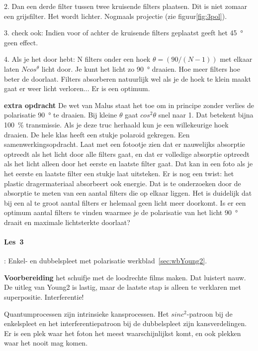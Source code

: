 \documentclass[../../main.tex]{subfiles}
\begin{document}
2. Dan een derde filter tussen twee kruisende filters plaatsen. Dit is niet zomaar een grijsfilter. Het wordt lichter. Nogmaals projectie (zie figuur\ref{fig:3pol}).

3. check ook: Indien voor of achter de kruisende filters geplaatst geeft het \SI{45}{\degree} geen effect.

4. Als je het door hebt: N filters onder een hoek $\theta=(90/(N-1))$ met elkaar laten $Ncos^\theta$ licht door. Je kunt het licht zo \SI{90}{\degree} draaien. Hoe meer filters hoe beter de doorlaat. Filters absorberen natuurlijk wel als je de hoek te klein maakt gaat er weer licht verloren... Er is een optimum. 


\textbf{extra opdracht}
De wet van Malus staat het toe om  in principe zonder verlies de polarisatie \SI{90}{\degree} te draaien. Bij kleine $\theta$ gaat $cos^2 \theta$ snel naar 1. Dat betekent bijna \SI{100}{\percent} transmissie. Als je deze truc herhaald kun je een willekeurige hoek draaien. De hele klas heeft een stukje polaroid gekregen. Een samenwerkingsopdracht.
Laat met een fotootje zien dat er nauwelijks absorptie optreedt als het licht door alle filters gaat, en dat er volledige absorptie optreedt als het licht alleen door het eerste en laatste filter gaat. Dat kan in een foto als je het eerste en laatste filter een stukje laat uitsteken. Er is nog een twist: het plastic dragermateriaal absorbeert ook energie. Dat is te onderzoeken door de absorptie te meten van een aantal filters die op elkaar liggen. Het is duidelijk dat bij een al te groot aantal filters er helemaal geen licht meer doorkomt. Is er een optimum aantal filters te vinden waarmee je de polarisatie van het licht \SI{90}{\degree} draait en maximale lichtsterkte doorlaat? 


\paragraph*{Les~3}: Enkel- en dubbelspleet met polarisatie
werkblad~\ref{sec:wbYoung2}.


\textbf{Voorbereiding} het schuifje met de loodrechte films maken. Dat luistert nauw. 
De uitleg van Young2 is lastig, maar de laatste stap is alleen te verklaren met  superpositie. Interferentie!


Quantumprocessen zijn intrinsieke kansprocessen. Het $sinc^2$-patroon bij de enkelspleet en het interferentiepatroon bij de dubbelspleet zijn kansverdelingen. Er is een plek waar het foton het meest waarschijnlijkst komt, en ook plekken waar het nooit mag komen.
\end{document}
